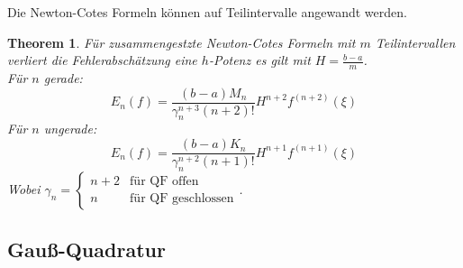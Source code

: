 \documentclass[10pt,a4paper]{article}
\newtheorem{theorem}{Theorem}
\begin{document}
	Die Newton-Cotes Formeln können auf Teilintervalle angewandt werden.
	\begin{theorem}
		Für zusammengestzte Newton-Cotes Formeln mit $m$ Teilintervallen verliert die Fehlerabschätzung eine $h$-Potenz es gilt mit $H=\frac{b-a}{m}$. \\
		Für $n$ gerade:
		$$E_n(f) = \frac{(b-a)M_n}{\gamma^{n+3}_n(n+2)!}H^{n+2}f^{(n+2)}(\xi)$$
		Für $n$ ungerade:
		$$E_n(f) = \frac{(b-a)K_n}{\gamma^{n+2}_n(n+1)!}H^{n+1}f^{(n+1)}(\xi)$$
		Wobei $\gamma_n= \begin{cases}
			n+2 & \text{für QF offen} \\
			n & \text{für QF geschlossen}
		\end{cases}$.
	\end{theorem}
	\subsection{Gauß-Quadratur}
\end{document}
